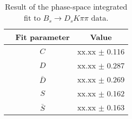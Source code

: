 \begin{table}[h]
\centering
\caption{Result of the phase-space integrated fit to $B_s \to D_s K \pi \pi$ data.}
\begin{tabular}{c c c}
\hline
\hline
& Fit parameter & Value \\
\hline
& $C$ &  xx.xx  $\pm$ 0.116\\
&$D$ &  xx.xx  $\pm$ 0.287\\
&$\bar D$ &  xx.xx  $\pm$ 0.269\\
& $S$ &  xx.xx  $\pm$ 0.162\\
& $\bar S$ &  xx.xx  $\pm$ 0.163\\
\hline
\hline
\end{tabular}
\label{table:timeFit_signal}
\end{table}